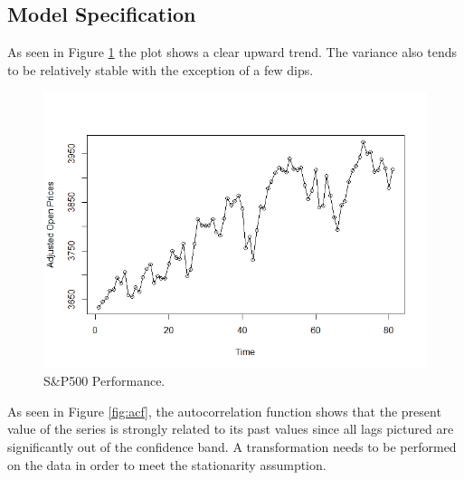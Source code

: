 \documentclass[12pt, centerh1]{article}
\begin{document}
\subsection{Model Specification}
As seen in Figure \ref{fig:USA_open} the plot shows a clear upward trend. The variance also tends to be relatively stable with the exception of a few dips.
\begin{figure}[H]
    \centering
    \includegraphics[scale=0.5]{imgs/USA_open.png}
    \caption{S\&P500 Performance.}
    \label{fig:USA_open}
\end{figure}
As seen in Figure \ref{fig:acf}, the autocorrelation function shows that the present value of the series is strongly related to its past values since all lags pictured are significantly out of the confidence band. A transformation needs to be performed on the data in order to meet the stationarity assumption.
\end{document}
